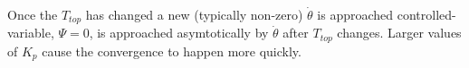 \documentclass{article}
\begin{document}
Once the $T_{top}$ has changed a new (typically non-zero)
$\dot{\theta}$ is approached controlled-variable, $\Psi = 0$,
is approached asymtotically by $\dot{\theta}$
after $T_{top}$ changes.
Larger values of $K_p$ cause the convergence
to happen more quickly.



\end{document}
